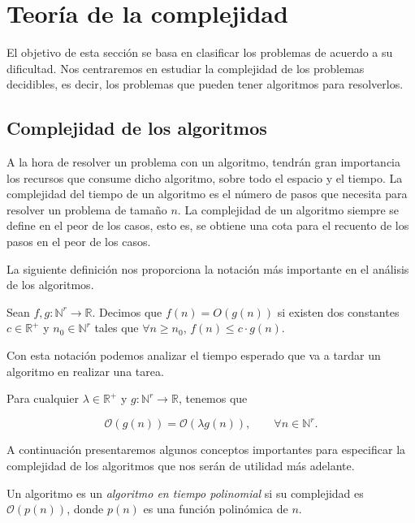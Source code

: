 \section{Teoría de la complejidad}

El objetivo de esta sección se basa en clasificar los problemas de acuerdo a su dificultad. Nos centraremos en estudiar la complejidad de los problemas decidibles, es decir, los problemas que pueden tener algoritmos para resolverlos.

\subsection{Complejidad de los algoritmos}

A la hora de resolver un problema con un algoritmo, tendrán gran importancia los recursos que consume dicho algoritmo, sobre todo el espacio y el tiempo. La complejidad del tiempo de un algoritmo es el número de pasos que necesita para resolver un problema de tamaño $n$. La complejidad de un algoritmo siempre se define en el peor de los casos, esto es, se obtiene una cota para el recuento de los pasos en el peor de los casos. 

La siguiente definición nos proporciona la notación más importante en el análisis de los algoritmos.

\begin{definition}
    Sean $f, g : \mathbb{N}^r \longrightarrow \mathbb{R}$. Decimos que $f(n) = O(g(n))$ si existen dos constantes $c \in \mathbb{R}^+$ y $n_0 \in \mathbb{N}^r$ tales que $\forall n \geq n_0$, $f(n) \leq c \cdot g(n)$.
\end{definition}

Con esta notación podemos analizar el tiempo esperado que va a tardar un algoritmo en realizar una tarea.

\begin{proposition}
    Para cualquier $\lambda \in \mathbb{R}^+$ y $g : \mathbb{N}^r \longrightarrow \mathbb{R}$, tenemos que

    $$\mathcal{O}(g(n)) = \mathcal{O}(\lambda g(n)), \qquad \forall n \in \mathbb{N}^r.$$
\end{proposition}

A continuación presentaremos algunos conceptos importantes para especificar la complejidad de los algoritmos que nos serán de utilidad más adelante.

\begin{definition}
    Un algoritmo es un \emph{algoritmo en tiempo polinomial} si su complejidad es $\mathcal{O}(p(n))$, donde $p(n)$ es una función polinómica de $n$.
\end{definition}


